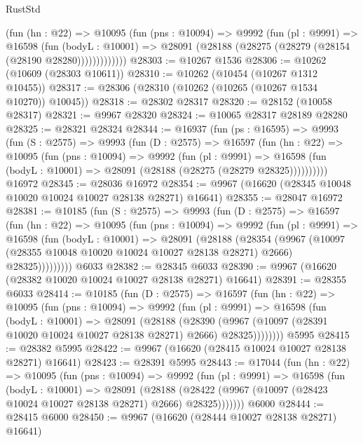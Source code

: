 \begin{lexlean}{RustStd}
\begin{coremodule}
            (fun (hn : @22) =>
            @10095
              (fun (pns : @10094) =>
              @9992
                (fun (pl : @9991) =>
                @16598
                  (fun (bodyL : @10001) =>
                  @28091 (@28188 (@28275 (@28279 (@28154 (@28190 @28280)))))))))))))
@28303 := @10267 @1536
@28306 := @10262 (@10609 (@28303 @10611))
@28310 := @10262 (@10454 (@10267 @1312 @10455))
@28317 := @28306 (@28310 (@10262 (@10265 (@10267 @1534 @10270)) @10045))
@28318 := @28302 @28317
@28320 := @28152 (@10058 @28317)
@28321 := @9967 @28320
@28324 := @10065 @28317 @28189 @28280
@28325 := @28321 @28324
@28344 := @16937
    (fun (ps : @16595) =>
    @9993
      (fun (S : @2575) =>
      @9993
        (fun (D : @2575) =>
        @16597
          (fun (hn : @22) =>
          @10095
            (fun (pns : @10094) =>
            @9992
              (fun (pl : @9991) =>
              @16598 (fun (bodyL : @10001) => @28091 (@28188 (@28275 (@28279 @28325))))))))))
    @16972
@28345 := @28036 @16972
@28354 := @9967 (@16620 (@28345 @10048 @10020 @10024 @10027 @28138 @28271) @16641)
@28355 := @28047 @16972
@28381 := @10185
    (fun (S : @2575) =>
    @9993
      (fun (D : @2575) =>
      @16597
        (fun (hn : @22) =>
        @10095
          (fun (pns : @10094) =>
          @9992
            (fun (pl : @9991) =>
            @16598
              (fun (bodyL : @10001) =>
              @28091
                (@28188
                  (@28354
                    (@9967
                      (@10097 (@28355 @10048 @10020 @10024 @10027 @28138 @28271) @2666)
                      @28325)))))))))
    @6033
@28382 := @28345 @6033
@28390 := @9967 (@16620 (@28382 @10020 @10024 @10027 @28138 @28271) @16641)
@28391 := @28355 @6033
@28414 := @10185
    (fun (D : @2575) =>
    @16597
      (fun (hn : @22) =>
      @10095
        (fun (pns : @10094) =>
        @9992
          (fun (pl : @9991) =>
          @16598
            (fun (bodyL : @10001) =>
            @28091
              (@28188
                (@28390
                  (@9967 (@10097 (@28391 @10020 @10024 @10027 @28138 @28271) @2666) @28325))))))))
    @5995
@28415 := @28382 @5995
@28422 := @9967 (@16620 (@28415 @10024 @10027 @28138 @28271) @16641)
@28423 := @28391 @5995
@28443 := @17044
    (fun (hn : @22) =>
    @10095
      (fun (pns : @10094) =>
      @9992
        (fun (pl : @9991) =>
        @16598
          (fun (bodyL : @10001) =>
          @28091
            (@28188 (@28422 (@9967 (@10097 (@28423 @10024 @10027 @28138 @28271) @2666) @28325)))))))
    @6000
@28444 := @28415 @6000
@28450 := @9967 (@16620 (@28444 @10027 @28138 @28271) @16641)

\end{coremodule}
\end{lexlean}
